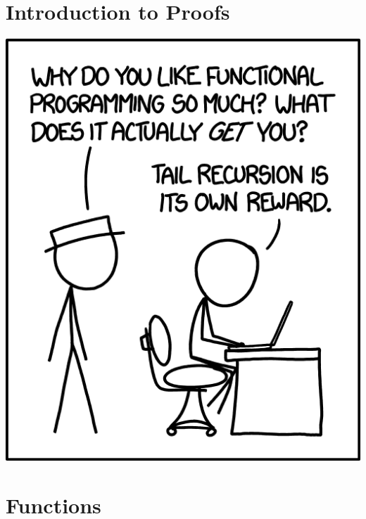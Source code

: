 \documentclass[oneside]{book}
\begin{document}
\chapter{Introduction to Proofs} \label{appendix:a}

    

\begin{savequote}
    \includegraphics[scale=0.7]{Graphics/functions.png}
\end{savequote}
\chapter{Functions} \label{appendix:b}

    
\end{document}
